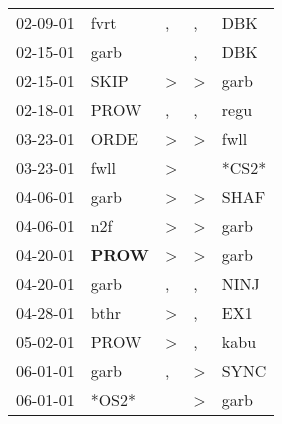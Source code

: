 \begin{supertabular}{p{0.07\textwidth}p{0.06\textwidth}p{0.02\textwidth}p{0.02\textwidth}p{0.06\textwidth}}
          02-09-01\textsuperscript{} &           fvrt\textsuperscript{} &                , &                , &            DBK\textsuperscript{} \\
          02-15-01\textsuperscript{} &           garb\textsuperscript{} &                  &                , &            DBK\textsuperscript{} \\
          02-15-01\textsuperscript{} &           SKIP\textsuperscript{} &     \textgreater &     \textgreater &           garb\textsuperscript{} \\
          02-18-01\textsuperscript{} &           PROW\textsuperscript{} &                , &                , &           regu\textsuperscript{} \\
          03-23-01\textsuperscript{} &           ORDE\textsuperscript{} &     \textgreater &     \textgreater &           fwll\textsuperscript{} \\
          03-23-01\textsuperscript{} &           fwll\textsuperscript{} &     \textgreater &                  &                            *CS2* \\
          04-06-01\textsuperscript{} &           garb\textsuperscript{} &     \textgreater &     \textgreater &           SHAF\textsuperscript{} \\
          04-06-01\textsuperscript{} &            n2f\textsuperscript{} &     \textgreater &     \textgreater &           garb\textsuperscript{} \\
          04-20-01\textsuperscript{} &  \textbf{PROW\textsuperscript{}} &     \textgreater &     \textgreater &           garb\textsuperscript{} \\
          04-20-01\textsuperscript{} &           garb\textsuperscript{} &                , &                , &           NINJ\textsuperscript{} \\
          04-28-01\textsuperscript{} &           bthr\textsuperscript{} &     \textgreater &                , &            EX1\textsuperscript{} \\
          05-02-01\textsuperscript{} &           PROW\textsuperscript{} &     \textgreater &                , &           kabu\textsuperscript{} \\
          06-01-01\textsuperscript{} &           garb\textsuperscript{} &                , &     \textgreater &           SYNC\textsuperscript{} \\
          06-01-01\textsuperscript{} &                            *OS2* &                  &     \textgreater &           garb\textsuperscript{} \\

\end{supertabular}
